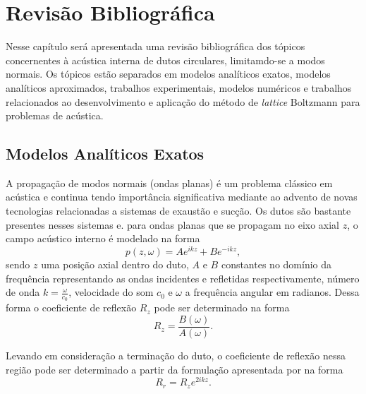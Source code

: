 \chapter{Revisão Bibliográfica}

Nesse capítulo será apresentada uma revisão bibliográfica dos tópicos concernentes à acústica interna de dutos circulares, limitamdo-se a modos normais. Os tópicos estão separados em modelos analíticos exatos, modelos analíticos aproximados, trabalhos experimentais, modelos numéricos e trabalhos relacionados ao desenvolvimento e aplicação do método de \textit{lattice} Boltzmann para problemas de acústica.

\section{Modelos Analíticos Exatos} 

A propagação de modos normais (ondas planas) é um problema clássico em acústica e continua tendo importância significativa mediante ao advento de novas tecnologias relacionadas a sistemas de exaustão e sucção. Os dutos são bastante presentes nesses sistemas e. para ondas planas que se propagam no eixo axial $z$, o campo acústico interno é modelado na forma
\begin{equation}
p(z,\omega) = Ae^{ikz} + Be^{-ikz}, 
\end{equation}   
sendo $z$ uma posição axial dentro do duto, $A$ e $B$ constantes no domínio da frequência representando as ondas incidentes e refletidas respectivamente, número de onda $k = \frac{\omega}{c_0}$, velocidade do som $c_{0}$ e $\omega$ a frequência angular em radianos. Dessa forma o coeficiente de reflexão $R_{z}$ pode ser determinado na forma
\begin{equation}
  R_{z} = \frac{B(\omega)}{A(\omega)}.
\end{equation}

Levando em consideração a terminação do duto, o coeficiente de reflexão nessa região pode ser determinado a partir da formulação apresentada por  na forma
\begin{equation}
  R_{r} = R_{z}e^{2ikz}.
\end{equation}

